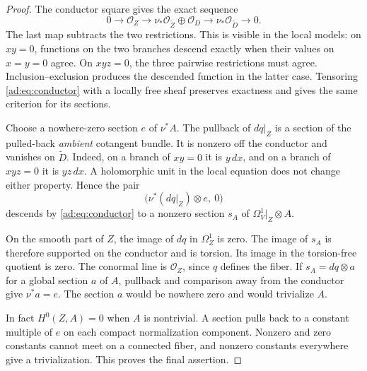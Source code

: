 \documentclass[11pt]{article}
\numberwithin{equation}{section}
\begin{document}
\begin{proof}
The conductor square gives the exact sequence
\begin{equation}\label{ad:eq:conductor}
 0\longrightarrow\mathcal O_Z
 \longrightarrow\nu_*\mathcal O_{\widetilde Z}\oplus\mathcal O_D
 \longrightarrow\nu_*\mathcal O_{\widetilde D}
 \longrightarrow0.
\end{equation}
The last map subtracts the two restrictions. This is visible in the
local models: on $xy=0$, functions on the two branches descend
exactly when their values on $x=y=0$ agree. On $xyz=0$, the three
pairwise restrictions must agree. Inclusion--exclusion produces
the descended function in the latter case. Tensoring
\eqref{ad:eq:conductor} with a locally free sheaf preserves
exactness and gives the same criterion for its sections.

Choose a nowhere-zero section $e$ of $\nu^*A$. The pullback of
$dq|_Z$ is a section of the pulled-back \emph{ambient} cotangent
bundle. It is nonzero off the conductor and vanishes on
$\widetilde D$. Indeed, on a branch of $xy=0$ it is $y\,dx$,
and on a branch of $xyz=0$ it is $yz\,dx$. A holomorphic unit in
the local equation does not change either property. Hence the pair
\[
 \bigl(\nu^*(dq|_Z)\otimes e,\ 0\bigr)
\]
descends by \eqref{ad:eq:conductor} to a nonzero section $s_A$ of
$\Omega_V^1|_Z\otimes A$.

On the smooth part of $Z$, the image of $dq$ in $\Omega_Z^1$ is
zero. The image of $s_A$ is therefore supported on the conductor
and is torsion. Its image in the torsion-free quotient is zero.
The conormal line is $\mathcal O_Z$, since $q$ defines the fiber.
If $s_A=dq\otimes a$ for a global section $a$ of $A$, pullback and
comparison away from the conductor give $\nu^*a=e$. The section
$a$ would be nowhere zero and would trivialize $A$.

In fact $H^0(Z,A)=0$ when $A$ is nontrivial. A section pulls back
to a constant multiple of $e$ on each compact normalization
component. Nonzero and zero constants cannot meet on a connected
fiber, and nonzero constants everywhere give a trivialization.
This proves the final assertion.
\end{proof}
\end{document}
